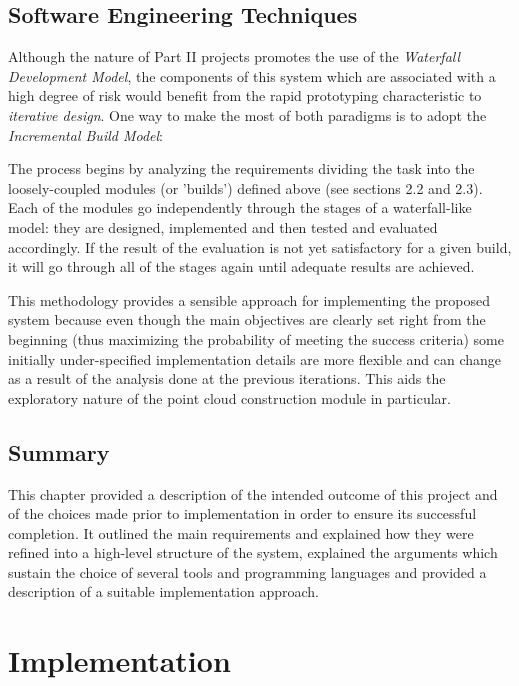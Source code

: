 \documentclass[12pt,a4paper,twoside,openright]{report}
\begin{document}
\section{Software Engineering Techniques}
Although the nature of Part II projects promotes the use of the \emph{Waterfall Development Model}, the components of this system which are associated with a high degree of risk would benefit from the rapid prototyping characteristic to \emph{iterative design}. One way to make the most of both paradigms is to adopt the \emph{Incremental Build Model}:\\
\begin{adjustwidth}{0.7cm}{}
The process begins by analyzing the requirements dividing the task into the loosely-coupled modules (or 'builds') defined above (see sections 2.2 and 2.3). Each of the modules go independently through the stages of a waterfall-like model: they are designed, implemented and then tested and evaluated accordingly. If the result of the evaluation is not yet satisfactory for a given build, it will go through all of the stages again until adequate results are achieved.\\
\end{adjustwidth} 
This methodology provides a sensible approach for implementing the proposed system because even though the main objectives are clearly set right from the beginning (thus maximizing the probability of meeting the success criteria) some initially under-specified implementation details are more flexible and can change as a result of the analysis done at the previous iterations. This aids the exploratory nature of the point cloud construction module in particular.  

\section{Summary}
This chapter provided a description of the intended outcome of this project and of the choices made prior to implementation in order to ensure its successful completion. It outlined the main requirements and explained how they were refined into a high-level structure of the system, explained the arguments which sustain the choice of several tools and programming languages and provided a description of a suitable implementation approach.
\chapter{Implementation}
\end{document}
